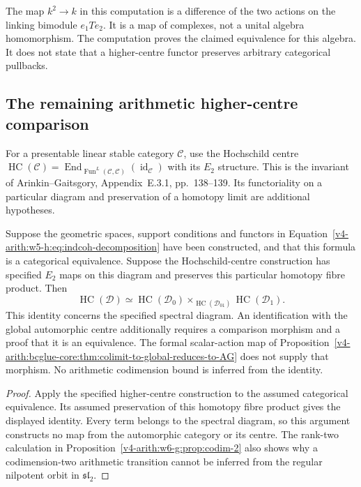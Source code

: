 The map $k^2\to k$ in this computation is a difference of the two
actions on the linking bimodule $e_1Te_2$.
It is a map of complexes, not a unital algebra homomorphism.
The computation proves the claimed equivalence for this algebra.
It does not state that a higher-centre functor preserves arbitrary
categorical pullbacks.

\subsection{The remaining arithmetic higher-centre comparison}

For a presentable linear stable category $\mathcal C$, use the Hochschild
centre
$\operatorname{HC}(\mathcal C)=
\operatorname{End}_{\operatorname{Fun}^L(\mathcal C,\mathcal C)}
(\operatorname{id}_{\mathcal C})$ with its $E_2$ structure.
This is the invariant of Arinkin--Gaitsgory, Appendix~E.3.1,
pp.~138--139. Its functoriality on a particular diagram and preservation
of a homotopy limit are additional hypotheses.

\begin{proposition}
\label{v4-arith:w5-h:thm:agdet-reduction}
\ClaimStatusProvedHereConditional
Suppose the geometric spaces, support conditions and functors in
Equation~\eqref{v4-arith:w5-h:eq:indcoh-decomposition} have been constructed,
and that this formula is a categorical equivalence.
Suppose the Hochschild-centre construction has specified $E_2$ maps
on this diagram and preserves this particular homotopy fibre product.
Then
\begin{equation}
\label{v4-arith:w5-h:eq:agdet-e2-compat}
 \operatorname{HC}(\mathcal D)\simeq
 \operatorname{HC}(\mathcal D_0)
 \times_{\operatorname{HC}(\mathcal D_{01})}
 \operatorname{HC}(\mathcal D_1).
\end{equation}
This identity concerns the specified spectral diagram.
An identification with the global automorphic centre additionally
requires a comparison morphism and a proof that it is an equivalence.
The formal scalar-action map of
Proposition~\ref{v4-arith:bcglue-core:thm:colimit-to-global-reduces-to-AG}
does not supply that morphism. No arithmetic codimension bound
is inferred from the identity.
\end{proposition}

\begin{proof}
Apply the specified higher-centre construction to the assumed
categorical equivalence. Its assumed preservation of this homotopy
fibre product gives the displayed identity.
Every term belongs to the spectral diagram, so this argument
constructs no map from the automorphic category or its centre.
The rank-two calculation in
Proposition~\ref{v4-arith:w6-g:prop:codim-2} also shows why a codimension-two
arithmetic transition cannot be inferred from the regular nilpotent
orbit in $\mathfrak{sl}_2$.
\end{proof}

